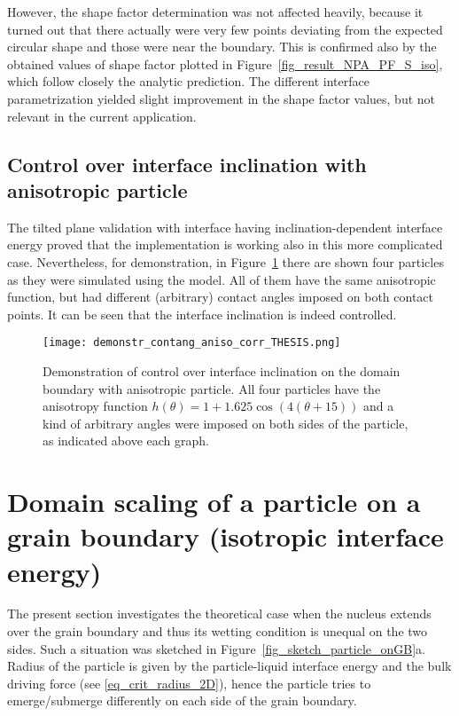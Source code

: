 	However, the shape factor determination was not affected heavily, because it turned out that there actually were very few points deviating from the expected circular shape and those were near the boundary. This is confirmed also by the obtained values of shape factor plotted in Figure~\ref{fig_result_NPA_PF_S_iso}, which follow closely the analytic prediction. The different interface parametrization yielded slight improvement in the shape factor values, but not relevant in the current application.
	
	\subsection{Control over interface inclination with anisotropic particle}
	The tilted plane validation with interface having inclination-dependent interface energy proved that the implementation is working also in this more complicated case. Nevertheless, for demonstration, in Figure~\ref{fig_demo_aniso_paticle_contangs_controlled} there are shown four particles as they were simulated using the model. All of them have the same anisotropic function, but had different (arbitrary) contact angles imposed on both contact points. It can be seen that the interface inclination is indeed controlled.
	
	\begin{figure}
		\centering
		\texttt{[image: demonstr\_contang\_aniso\_corr\_THESIS.png]}
		\caption[Demonstration of control over interface inclination on the domain boundary with anisotropic particle.]{Demonstration of control over interface inclination on the domain boundary with anisotropic particle. All four particles have the anisotropy function $h(\theta)=1+1.625\cos(4(\theta+15))$ and a kind of arbitrary angles were imposed on both sides of the particle, as indicated above each graph.}
		\label{fig_demo_aniso_paticle_contangs_controlled}
	\end{figure}
		

\section{Domain scaling of a particle on a grain boundary (isotropic interface energy)}
The present section investigates the theoretical case when the nucleus extends over the grain boundary and thus its wetting condition is unequal on the two sides. Such a situation was sketched in Figure~\ref{fig_sketch_particle_onGB}a. Radius of the particle is given by the particle-liquid interface energy and the bulk driving force (see \eqref{eq_crit_radius_2D}), hence the particle tries to emerge/submerge differently on each side of the grain boundary.

